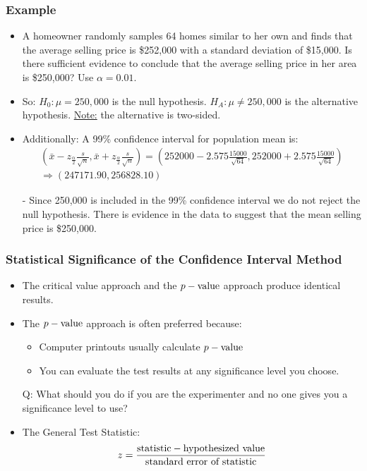 \documentclass[12pt, letterpaper]{article}
\begin{document}
            \subsubsection*{Example}
                \begin{itemize}
                    \item A homeowner randomly samples 64 homes similar to her own and finds that the average selling price is \$252,000 with a standard deviation of \$15,000. Is there sufficient evidence to conclude that the average selling price in her area is \$250,000? Use $\alpha = 0.01$.
                    \item So: $H_0 : \mu = 250,000$ is the null hypothesis. $H_A : \mu \neq 250,000$ is the alternative hypothesis. \underline{Note:} the alternative is two-sided.
                    \item Additionally: A 99\% confidence interval for population mean is: 
                    \begin{align*}
                        \left(\bar{x}-z_{\frac{\alpha}{2}}\frac{s}{\sqrt{n}}, \bar{x}+z_{\frac{\alpha}{2}}\frac{s}{\sqrt{n}}\right) = \left(252000 - 2.575\frac{15000}{\sqrt{64}}, 252000+2.575\frac{15000}{\sqrt{64}}\right) \\
                        \Rightarrow (247171.90, 256828.10)
                    \end{align*}
                    \item[-] Since 250,000 is included in the 99\% confidence interval we do not reject the null hypothesis. There is evidence in the data to suggest that the mean selling price is \$250,000.
                \end{itemize}
            \subsubsection{Statistical Significance of the Confidence Interval Method}
                \begin{itemize}
                    \item The critical value approach and the $p-\textnormal{value}$ approach produce identical results.
                    \item The $p-\textnormal{value}$ approach is often preferred because:
                    \begin{itemize}
                        \item Computer printouts usually calculate $p-\textnormal{value}$
                        \item You can evaluate the test results at any significance level you choose.
                    \end{itemize}
                    \item[Q:] What should you do if you are the experimenter and no one gives you a significance level to use?
                    \item The General Test Statistic: $$z = \frac{\textnormal{statistic} - \textnormal{hypothesized value}}{\textnormal{standard error of statistic}}$$
                \end{itemize}
\end{document}
